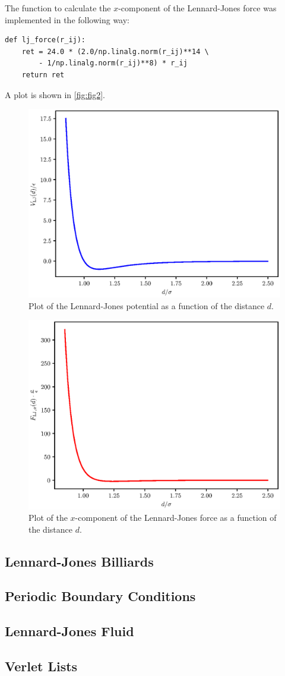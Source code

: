 \documentclass[a4paper,10pt,bibtotoc]{scrartcl}
\begin{document}
The function to calculate the $x$-component of the Lennard-Jones force was implemented in the following way:
\begin{lstlisting}
def lj_force(r_ij):
    ret = 24.0 * (2.0/np.linalg.norm(r_ij)**14 \
        - 1/np.linalg.norm(r_ij)**8) * r_ij
    return ret
\end{lstlisting}
A plot is shown in \autoref{fig:fig2}.

\begin{figure}[t]
 \includegraphics{lennard_jones_potential.eps}
 \caption{Plot of the Lennard-Jones potential as a function of the distance $d$.}
 \label{fig:fig1}
\end{figure}
\begin{figure}[t]
 \includegraphics{lennard_jones_force.eps}
 \caption{Plot of the $x$-component of the Lennard-Jones force as a function of the distance $d$.}
 \label{fig:fig2}
\end{figure}

\subsection{Lennard-Jones Billiards}
\subsection{Periodic Boundary Conditions}
\subsection{Lennard-Jones Fluid}
\subsection{Verlet Lists}
\end{document}
